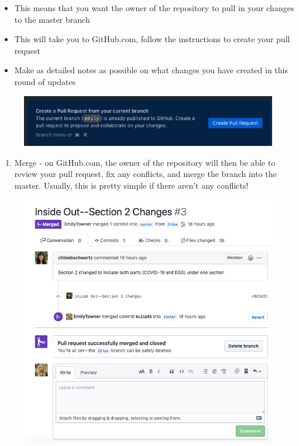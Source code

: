 \documentclass[]{book}
\providecommand{\tightlist}{%
  \setlength{\itemsep}{0pt}\setlength{\parskip}{0pt}}
\begin{document}
\begin{itemize}
\tightlist
\item
  This means that you want the owner of the repository to pull in your
  changes to the master branch
\item
  This will take you to GitHub.com, follow the instructions to create
  your pull request
\item
  Make as detailed notes as possible on what changes you have created in
  this round of updates
\end{itemize}

\begin{figure}
\centering
\includegraphics{images/research_protocols/github/27.png}
\caption{}
\end{figure}

\begin{enumerate}
\def\labelenumi{\arabic{enumi}.}
\setcounter{enumi}{7}
\tightlist
\item
  Merge - on GitHub.com, the owner of the repository will then be able
  to review your pull request, fix any conflicts, and merge the branch
  into the master. Usually, this is pretty simple if there aren't any
  conflicts!
\end{enumerate}

\begin{figure}
\centering
\includegraphics{images/research_protocols/github/28.png}
\caption{}
\end{figure}
\end{document}
